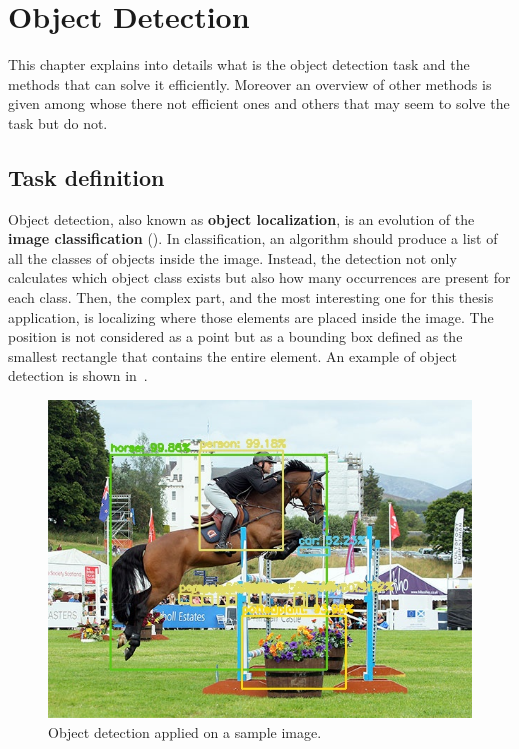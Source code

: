\chapter{Object Detection} \label{cha:detection}
This chapter explains into details what is the object detection task and the methods that can solve it efficiently. Moreover an overview of other methods is given among whose there not efficient ones and others that may seem to solve the task but do not.

\section{Task definition}
Object detection, also known as \textbf{object localization}, is an evolution of the \textbf{image classification} (). In classification, an algorithm should produce a list of all the classes of objects inside the image. Instead, the detection not only calculates which object class exists but also how many occurrences are present for each class. Then, the complex part, and the most interesting one for this thesis application, is localizing where those elements are placed inside the image. The position is not considered as a point but as a bounding box defined as the smallest rectangle that contains the entire element. An example of object detection is shown in~.
\begin{figure}[!h]
	\centering
	\includegraphics[width=0.8\linewidth]{images/detection/ex1_yolo}
	\caption[Object detection applied on a sample image.]{Object detection applied on a sample image\protect\footnotemark.}
	\label{fig:sampleYolo}
\end{figure}

